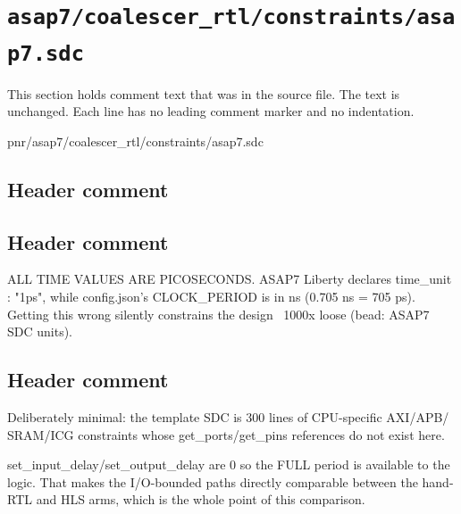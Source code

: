\section{\texttt{asap7/coalescer\_rtl/constraints/asap7.sdc}}\label{tm:pd:asap7-coalescer-rtl-sdc}

This section holds comment text that was in the source file. The text is unchanged. Each line has no leading comment marker and no indentation.

\begin{relocated}{pnr/asap7/coalescer_rtl/constraints/asap7.sdc}

\subsection*{Header comment}


\subsection*{Header comment}

\begin{textblock}
ALL TIME VALUES ARE PICOSECONDS. ASAP7 Liberty declares time_unit : "1ps",
while config.json's CLOCK_PERIOD is in ns (0.705 ns = 705 ps). Getting this
wrong silently constrains the design ~1000x loose (bead: ASAP7 SDC units).
\end{textblock}

\subsection*{Header comment}

\begin{textblock}
Deliberately minimal: the template SDC is 300 lines of CPU-specific AXI/APB/
SRAM/ICG constraints whose get_ports/get_pins references do not exist here.

set_input_delay/set_output_delay are 0 so the FULL period is available to the
logic. That makes the I/O-bounded paths directly comparable between the
hand-RTL and HLS arms, which is the whole point of this comparison.
\end{textblock}

\end{relocated}


